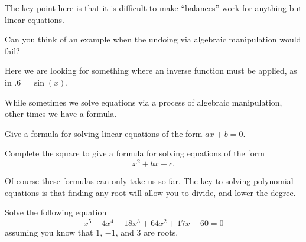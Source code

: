 \begin{teachingnote}
The key point here is that it is difficult to make ``balances'' work
for anything but linear equations.
\end{teachingnote}



\begin{prob}
Can you think of an example when the undoing via algebraic
manipulation would fail?
\end{prob}

\begin{teachingnote}
Here we are looking for something where an inverse function must be
applied, as in $.6 = \sin(x)$.
\end{teachingnote}


While sometimes we solve equations via a process of algebraic
manipulation, other times we have a formula.


\begin{prob}
Give a formula for solving linear equations of the form $ax + b =0$.
\end{prob}

\begin{prob}
Complete the square to give a formula for solving equations of the form
\[
x^2 + bx + c.
\]
\end{prob}


Of course these formulas can only take us so far. The key to solving
polynomial equations is that finding any root will allow you to
divide, and lower the degree.

\begin{prob}
Solve the following equation
\[
x^5 - 4x^4 - 18x^3 + 64x^2 + 17x -60 = 0
\]
assuming you know that $1$, $-1$, and $3$ are roots.
\end{prob}


